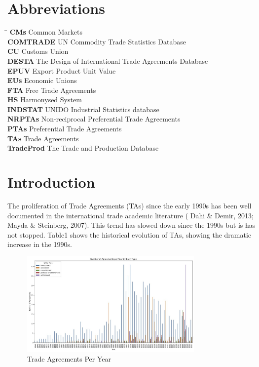 \documentclass[12pt]{article}%
\begin{document}
\section*{Abbreviations}%
\label{sec:Abbreviations}%
\begin{tabbing}%
\hspace{3cm} \= \kill%
\textbf{CMs} \> Common Markets \\%
\textbf{COMTRADE} \> UN Commodity Trade Statistics Database \\%
\textbf{CU} \> Customs Union \\%
\textbf{DESTA} \> The Design of International Trade Agreements Database \\%
\textbf{EPUV} \> Export Product Unit Value \\%
\textbf{EUs} \> Economic Unions \\%
\textbf{FTA} \> Free Trade Agreements \\%
\textbf{HS} \> Harmonysed System \\%
\textbf{INDSTAT } \> UNIDO Industrial Statistics database \\%
\textbf{NRPTAs} \> Non-reciprocal Preferential Trade Agreements \\%
\textbf{PTAs} \> Preferential Trade Agreements \\%
\textbf{TAs} \> Trade Agreements \\%
\textbf{TradeProd} \> The Trade and Production Database \\%
\end{tabbing}

%
\newpage%
\listoffigures%
\newpage%
\listoftables%
\newpage%
%
\pagestyle{mainmatter}%
\section{Introduction}%
\label{sec:Introduction}%
The proliferation of Trade Agreements (TAs) since the early 1990s has
been well documented in the international trade academic literature
(\cite{dahi_preferential_2013} Dahi \& Demir, 2013; \cite{mayda_south-south_2007} Mayda \& Steinberg, 2007). This trend has slowed
down since the 1990s but is has not stopped. Table1 shows the historical
evolution of TAs, showing the dramatic increase in the 1990s.%


\begin{figure}[h!]%
\centering%
\includegraphics[width=0.8\textwidth]{figures/all_entries_agreements_per_year.jpg}%
\caption{Trade Agreements Per Year}%
\end{figure}
\end{document}
